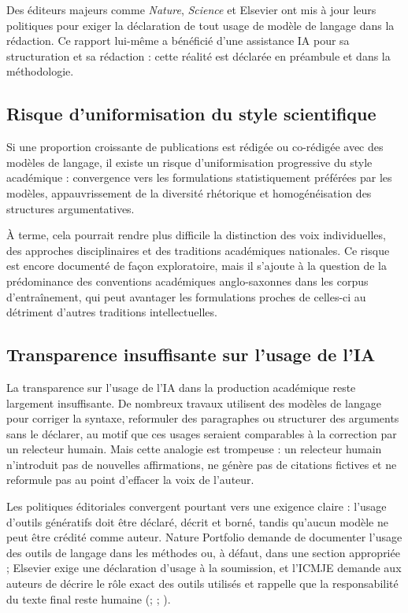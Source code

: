 \documentclass[
  10pt,
  a4paper,
  DIV=11,
  numbers=noendperiod,
  oneside]{scrreprt}
\let\oldemph\emph
\renewcommand{\emph}[1]{\oldemph{\textcolor{cmmgray}{#1}}}
\begin{document}
Des éditeurs majeurs comme \emph{Nature}, \emph{Science} et Elsevier ont
mis à jour leurs politiques pour exiger la déclaration de tout usage de
modèle de langage dans la rédaction. Ce rapport lui-même a bénéficié
d'une assistance IA pour sa structuration et sa rédaction : cette
réalité est déclarée en préambule et dans la méthodologie.

\subsection{Risque d'uniformisation du style
scientifique}\label{risque-duniformisation-du-style-scientifique}

Si une proportion croissante de publications est rédigée ou co-rédigée
avec des modèles de langage, il existe un risque d'uniformisation
progressive du style académique : convergence vers les formulations
statistiquement préférées par les modèles, appauvrissement de la
diversité rhétorique et homogénéisation des structures argumentatives.

À terme, cela pourrait rendre plus difficile la distinction des voix
individuelles, des approches disciplinaires et des traditions
académiques nationales. Ce risque est encore documenté de façon
exploratoire, mais il s'ajoute à la question de la prédominance des
conventions académiques anglo-saxonnes dans les corpus d'entraînement,
qui peut avantager les formulations proches de celles-ci au détriment
d'autres traditions intellectuelles.

\subsection{Transparence insuffisante sur l'usage de
l'IA}\label{transparence-insuffisante-sur-lusage-de-lia}

La transparence sur l'usage de l'IA dans la production académique reste
largement insuffisante. De nombreux travaux utilisent des modèles de
langage pour corriger la syntaxe, reformuler des paragraphes ou
structurer des arguments sans le déclarer, au motif que ces usages
seraient comparables à la correction par un relecteur humain. Mais cette
analogie est trompeuse : un relecteur humain n'introduit pas de
nouvelles affirmations, ne génère pas de citations fictives et ne
reformule pas au point d'effacer la voix de l'auteur.

Les politiques éditoriales convergent pourtant vers une exigence claire
: l'usage d'outils génératifs doit être déclaré, décrit et borné, tandis
qu'aucun modèle ne peut être crédité comme auteur. Nature Portfolio
demande de documenter l'usage des outils de langage dans les méthodes
ou, à défaut, dans une section appropriée ; Elsevier exige une
déclaration d'usage à la soumission, et l'ICMJE demande aux auteurs de
décrire le rôle exact des outils utilisés et rappelle que la
responsabilité du texte final reste humaine
(;
;
).
\end{document}
